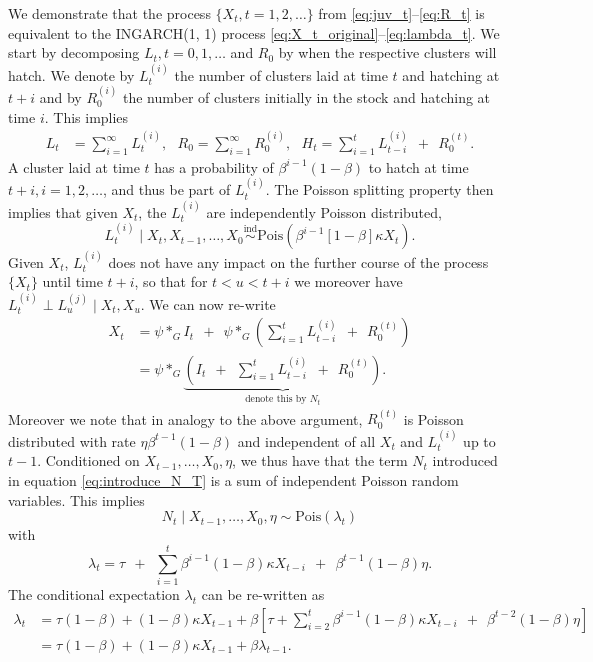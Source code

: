 \documentclass[review]{elsarticle}
\begin{document}
We demonstrate that the process $\{X_t, t = 1, 2, \dots\}$ from \eqref{eq:juv_t}--\eqref{eq:R_t} is equivalent to the INGARCH(1, 1) process \eqref{eq:X_t_original}--\eqref{eq:lambda_t}. We start by decomposing $L_t, t = 0, 1, \dots$ and $R_0$ by when the respective clusters will hatch. We denote by $L_t^{(i)}$ the number of clusters laid at time $t$ and hatching at $t + i$ and by $R^{(i)}_0$ the number of clusters initially in the stock and hatching at time $i$. This implies
\begin{align*}
L_t & = \sum_{i = 1}^\infty L_t^{(i)}, \ \ \ 
R_0 = \sum_{i = 1}^\infty R_0^{(i)}, \ \ \ 
H_t = \sum_{i = 1}^{t} L_{t - i}^{(i)} \ \ + \ \ R_0^{(t)}.
\end{align*}
A cluster laid at time $t$ has a probability of $\beta^{i - 1}(1 - \beta)$ to hatch at time $t + i, i = 1, 2, \dots$, and thus be part of $L_t^{(i)}$. The Poisson splitting property \cite{Kingman1993} then implies that given $X_t$, the $L_t^{(i)}$ are independently Poisson distributed,
$$
L_t^{(i)} \mid X_t, X_{t - 1}, \dots, X_0 \stackrel{\text{ind}}{\sim} \text{Pois}(\beta^{i - 1}[1 - \beta]\kappa X_t). %
$$
Given $X_t$, $L_t^{(i)}$ does not have any impact on the further course of the process $\{X_t\}$ until time $t + i$, so that for $t < u < t + i$ we moreover have $L_t^{(i)} \perp L_u^{(j)} \mid X_t, X_u$. We can now re-write
\begin{align}
X_t & = \psi *_G I_t \ \ + \ \ \psi *_G\left(\sum_{i = 1}^{t} L_{t - i}^{(i)} \ \ + \ \ R_0^{(t)}\right)\nonumber \\
& = \psi *_G \underbrace{\left( I_t \ \ + \ \ \sum_{i = 1}^{t} L_{t - i}^{(i)} \ \ + \ \ R_0^{(t)}\right)}_{\text{denote this by } N_t}. \label{eq:introduce_N_T}
\end{align}
Moreover we note that in analogy to the above argument, $R_0^{(t)}$ is Poisson distributed with rate $\eta\beta^{t - 1}(1 - \beta)$ and independent of all $X_t$ and $L_t^{(i)}$ up to $t - 1$. Conditioned on $X_{t - 1}, \dots, X_0, \eta$, we thus have that the term $N_t$ introduced in equation \eqref{eq:introduce_N_T} is a sum of independent Poisson random variables. This implies
$$
N_t \mid X_{t - 1}, \dots, X_0, \eta \sim \text{Pois}(\lambda_t)
$$
with
$$
\lambda_t = \tau \ \ + \ \ \sum_{i = 1}^t \beta^{i - 1}(1 - \beta)\kappa X_{t - i} \ \ + \ \ \beta^{t - 1}(1 - \beta)\eta.
$$
The conditional expectation $\lambda_t$ can be re-written as
\begin{align*}
\lambda_t & = \tau(1 - \beta) + (1 - \beta)\kappa X_{t - 1} + \beta \left[\tau +   \sum_{i = 2}^t \beta^{i - 1}(1 - \beta)\kappa X_{t - i}  \ \ + \ \ \beta^{t - 2}(1 - \beta)\eta\right]\\
& = \tau(1 - \beta) + (1 - \beta)\kappa X_{t - 1} + \beta \lambda_{t - 1}.
\end{align*}
\end{document}
